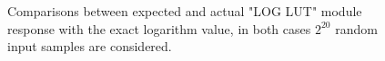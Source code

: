 \documentclass[12pt]{article}
\begin{document}
\begin{figure}[h]
    \begin{minipage}[c]{0.5\linewidth}
        \vspace{0pt}
        \centering
    \end{minipage}%
    \hfill%
    \begin{minipage}[c]{0.5\linewidth}
        \vspace{0pt}
        \centering
    \end{minipage}%
    \caption{Comparisons between expected and actual "LOG LUT" module response with the exact logarithm value, in both cases $2^{20}$ random input samples are considered.}
    \label{fig:LUT_LOG}
\end{figure}
\end{document}
